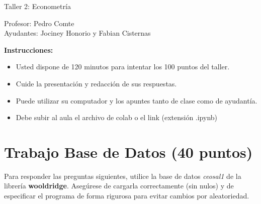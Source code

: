 \documentclass[letterpaper,11pt]{article}
\begin{document}
\begin{center}
    {\Large  Taller 2: Econometría }

Profesor:    Pedro Comte\\
Ayudantes: Jociney Honorio y Fabian Cisternas
\end{center}

\textbf{Instrucciones:} 

\begin{itemize}
    \item Usted dispone de 120 minutos  para intentar los 100 puntos del taller.
    \item Cuide la presentación y redacción de sus respuestas.
    \item Puede utilizar su computador y los apuntes tanto de clase como de ayudantía.
    \item Debe subir al aula el archivo de colab o el link (extensión .ipynb)
\end{itemize}

\section{Trabajo Base de Datos (40 puntos)}

Para responder las preguntas siguientes, utilice la base de datos \textit{ceosal1} de la librería \textbf{wooldridge}. Asegúrese de cargarla correctamente (sin nulos) y de especificar el programa de forma rigurosa para evitar cambios por aleatoriedad.
\end{document}
